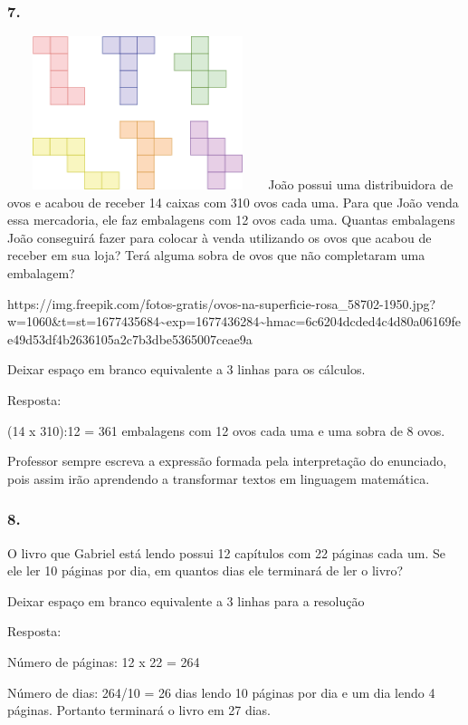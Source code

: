 \subsubsection{7.}\label{section-19}

\includegraphics[width=3.00278in,height=1.75833in]{media/image36.png}João
possui uma distribuidora de ovos e acabou de receber 14 caixas com 310
ovos cada uma. Para que João venda essa mercadoria, ele faz embalagens
com 12 ovos cada uma. Quantas embalagens João conseguirá fazer para
colocar à venda utilizando os ovos que acabou de receber em sua loja?
Terá alguma sobra de ovos que não completaram uma embalagem?

https://img.freepik.com/fotos-gratis/ovos-na-superficie-rosa\_58702-1950.jpg?w=1060\&t=st=1677435684\textasciitilde{}exp=1677436284\textasciitilde{}hmac=6c6204dcded4c4d80a06169fee49d53df4b2636105a2c7b3dbe5365007ceae9a

Deixar espaço em branco equivalente a 3 linhas para os cálculos.

Resposta:

(14 x 310):12 = 361 embalagens com 12 ovos cada uma e uma sobra de 8
ovos.

Professor sempre escreva a expressão formada pela interpretação do
enunciado, pois assim irão aprendendo a transformar textos em linguagem
matemática.

\subsubsection{8.}\label{section-20}

O livro que Gabriel está lendo possui 12 capítulos com 22 páginas cada
um. Se ele ler 10 páginas por dia, em quantos dias ele terminará de ler
o livro?

Deixar espaço em branco equivalente a 3 linhas para a resolução

Resposta:

Número de páginas: 12 x 22 = 264

Número de dias: 264/10 = 26 dias lendo 10 páginas por dia e um dia lendo
4 páginas. Portanto terminará o livro em 27 dias.

